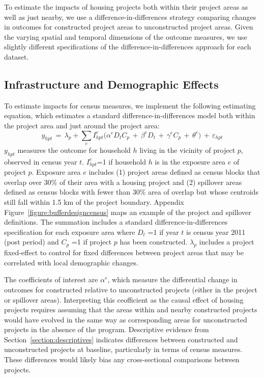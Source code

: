 \documentclass[12pt]{article}
\begin{document}
To estimate the impacts of housing projects both within their project areas as well as just nearby, we use a difference-in-differences strategy comparing changes in outcomes for constructed project areas to unconstructed project areas.  Given the varying spatial and temporal dimensions of the outcome measures, we use slightly different specifications of the difference-in-differences approach for each dataset.

\subsection{Infrastructure and Demographic Effects}\label{section:resultscensus}

To estimate impacts for census measures, we implement the following estimating equation, which estimates a standard difference-in-differences model both within the project area and just around the project area:
\begin{equation*}
y_{hpt} \, = \, \lambda_p + \sum\limits_{e} I^e_{hpt}\Big( \alpha^e D_tC_p \, + \, \beta^eD_t \, + \, \gamma^eC_p \, + \, \theta^e \Big) \, + \, \varepsilon_{hpt}
\end{equation*}
$y_{hpt}$ measures the outcome for household $h$ living in the vicinity of project $p$, observed in census year $t$.  $I^e_{hpt}$=1 if household $h$ is in the exposure area $e$ of project $p$.  Exposure area $e$ includes (1) project areas defined as census blocks that overlap over 30\% of their area with a housing project and (2) spillover areas defined as census blocks with fewer than 30\% area of overlap but whose centroids still fall within 1.5 km of the project boundary.  Appendix Figure~\ref{figure:bufferdesigncensus} maps an example of the project and spillover definitions.  The summation includes a standard difference-in-differences specification for each exposure area where $D_{t}\,\,$=1 if year $t$ is census year 2011 (post period) and $C_{p}\,\,$=1 if project $p$ has been constructed.  $\lambda_p$ includes a project fixed-effect to control for fixed differences between project areas that may be correlated with local demographic changes.  

The coefficients of interest are $\alpha^e$, which measure the differential change in outcomes for constructed relative to unconstructed projects (either in the project or spillover areas).  Interpreting this ceofficient as the causal effect of housing projects requires assuming that the areas within and nearby constructed projects would have evolved in the same way as corresponding areas for unconstructed projects in the absence of the program.  Descriptive evidence from Section~\ref{section:descriptives} indicates differences between constructed and unconstructed projects at baseline, particularly in terms of census measures.  These differences would likely bias any cross-sectional comparisons between projects.  
\end{document}

